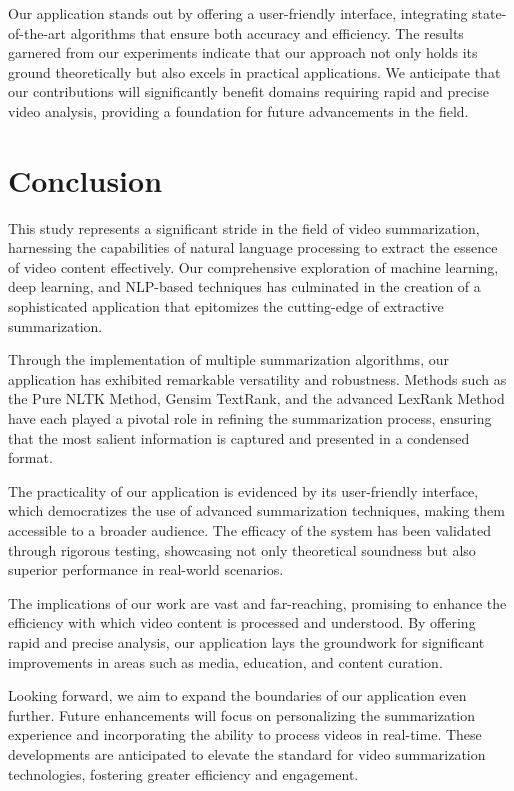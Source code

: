 \documentclass{ieeeaccess}
\begin{document}
Our application stands out by offering a user-friendly interface, integrating state-of-the-art algorithms that ensure both accuracy and efficiency. The results garnered from our experiments indicate that our approach not only holds its ground theoretically but also excels in practical applications. We anticipate that our contributions will significantly benefit domains requiring rapid and precise video analysis, providing a foundation for future advancements in the field.

\section{Conclusion}
\label{conclusion}
This study represents a significant stride in the field of video summarization, harnessing the capabilities of natural language processing to extract the essence of video content effectively. Our comprehensive exploration of machine learning, deep learning, and NLP-based techniques has culminated in the creation of a sophisticated application that epitomizes the cutting-edge of extractive summarization.

Through the implementation of multiple summarization algorithms, our application has exhibited remarkable versatility and robustness. Methods such as the Pure NLTK Method, Gensim TextRank, and the advanced LexRank Method have each played a pivotal role in refining the summarization process, ensuring that the most salient information is captured and presented in a condensed format.

The practicality of our application is evidenced by its user-friendly interface, which democratizes the use of advanced summarization techniques, making them accessible to a broader audience. The efficacy of the system has been validated through rigorous testing, showcasing not only theoretical soundness but also superior performance in real-world scenarios.

The implications of our work are vast and far-reaching, promising to enhance the efficiency with which video content is processed and understood. By offering rapid and precise analysis, our application lays the groundwork for significant improvements in areas such as media, education, and content curation.

Looking forward, we aim to expand the boundaries of our application even further. Future enhancements will focus on personalizing the summarization experience and incorporating the ability to process videos in real-time. These developments are anticipated to elevate the standard for video summarization technologies, fostering greater efficiency and engagement.
\end{document}
